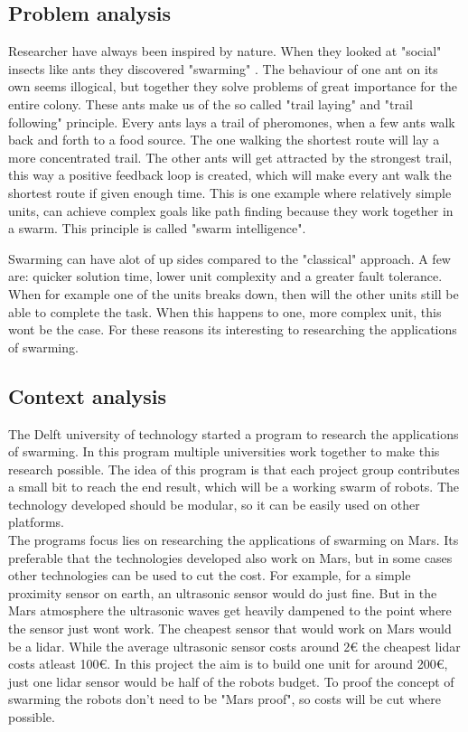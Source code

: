 \documentclass[10pt,a4paper]{article}
\begin{document}
\subsection{Problem analysis}
Researcher have always been inspired by nature. When they looked at "social" insects like ants they discovered "swarming"\cite{swarmwiki} . The behaviour of one ant on its own seems illogical, but together they solve problems of great importance for the entire colony. These ants make us of the so called "trail laying" and "trail following" principle. Every ants lays a trail of pheromones, when a few ants walk back and forth to a food source. The one walking the shortest route will lay a more concentrated trail. The other ants will get attracted by the strongest trail, this way a positive feedback loop is created, which will make every ant walk the shortest route if given enough time. This is one example where relatively simple units, can achieve complex goals like path finding because they work together in a swarm. This principle is called "swarm intelligence"\cite{swarmintelligence}.

Swarming can have alot of up sides compared to the "classical" approach. A few are: quicker solution time, lower unit complexity and a greater fault tolerance\cite{swarmintelligence}. When for example one of the units breaks down, then will the other units still be able to complete the task. When this happens to one, more complex unit, this wont be the case. For these reasons its interesting to researching the applications of swarming.



\subsection{Context analysis}
The Delft university of technology started a program to research the applications of swarming. In this program multiple universities work together to make this research possible. The idea of this program is that each project group contributes a small bit to reach the end result, which will be a working swarm of robots. The technology developed should be modular, so it can be easily used on other platforms.\\The programs focus lies on researching the applications of swarming on Mars. Its preferable that the technologies developed also work on Mars, but in some cases other technologies can be used to cut the cost. For example, for a simple proximity sensor on earth, an ultrasonic sensor would do just fine. But in the Mars atmosphere the ultrasonic waves get heavily dampened to the point where the sensor just wont work\cite{soundonmars}. The cheapest sensor that would work on Mars would be a lidar\cite{lidarmars}. While the average ultrasonic sensor costs around 2$\euro$ the cheapest lidar costs atleast 100$\euro$. In this project the aim is to build one unit for around 200$\euro$, just one lidar sensor would be half of the robots budget. To proof the concept of swarming the robots don't need to be "Mars proof", so costs will be cut where possible.\\
\end{document}
